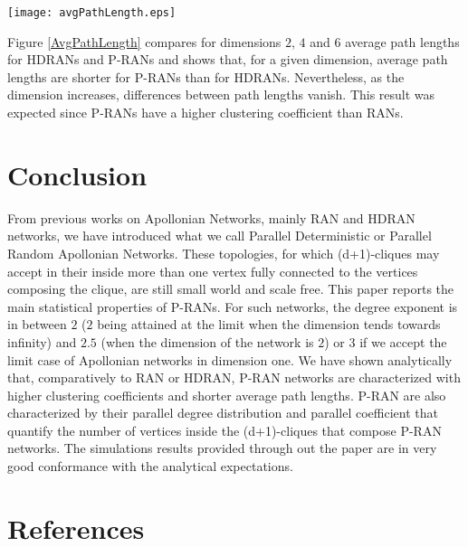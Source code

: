 \documentclass[11pt]{iopart}
\begin{document}
\begin{figure*}[htbp]
\centering
\texttt{[image: avgPathLength.eps]}
\caption{Average path length in RANs and P-RANs}
\label{AvgPathLength}
\end{figure*}


Figure \ref{AvgPathLength} compares for dimensions $2$, $4$ and $6$ average path lengths for HDRANs and P-RANs and shows that, for a given dimension, average path lengths are shorter for P-RANs than for HDRANs. Nevertheless, as the dimension increases, differences between path lengths vanish. This result was expected since P-RANs have a higher clustering coefficient than RANs.

\section{Conclusion}

From previous works on Apollonian Networks, mainly RAN and HDRAN networks, we have introduced what we call Parallel Deterministic or Parallel Random Apollonian Networks. These topologies, for which (d+1)-cliques may accept in their inside more than one vertex fully connected to the vertices composing the clique, are still small world and scale free. This paper reports the main statistical properties of P-RANs. For such networks, the degree exponent is in between $2$ 
($2$ being attained at the limit when the dimension tends towards infinity)  and $2.5$ (when the dimension of the network is $2$) or $3$ if we accept the limit case of Apollonian networks in dimension one. We have shown analytically that, comparatively to RAN or HDRAN, P-RAN networks are characterized with higher clustering coefficients and shorter average path lengths. P-RAN are also characterized by their parallel degree distribution and parallel coefficient that quantify the number of vertices inside the (d+1)-cliques that compose P-RAN networks. The  simulations results provided through out the paper are in very good conformance with the analytical expectations. 

\section{References}


\end{document}
